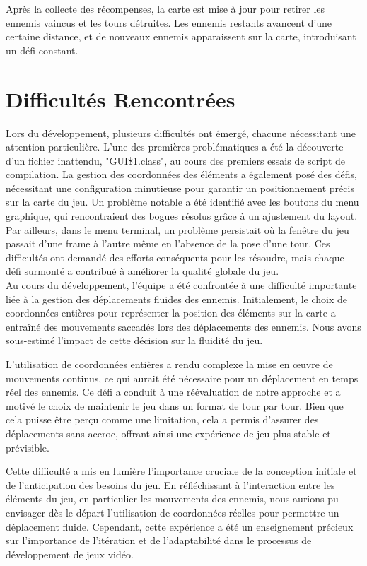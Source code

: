 \documentclass{article}
\begin{document}
Après la collecte des récompenses, la carte est mise à jour pour retirer les ennemis vaincus et les tours détruites. Les ennemis restants avancent d'une certaine distance, et de nouveaux ennemis apparaissent sur la carte, introduisant un défi constant.

\section{Difficultés Rencontrées}
Lors du développement, plusieurs difficultés ont émergé, chacune nécessitant une attention particulière. L'une des premières problématiques a été la découverte d'un fichier inattendu, "GUI\$1.class", au cours des premiers essais de script de compilation. La gestion des coordonnées des éléments a également posé des défis, nécessitant une configuration minutieuse pour garantir un positionnement précis sur la carte du jeu. Un problème notable a été identifié avec les boutons du menu graphique, qui rencontraient des bogues résolus grâce à un ajustement du layout. Par ailleurs, dans le menu terminal, un problème persistait où la fenêtre du jeu passait d'une frame à l'autre même en l'absence de la pose d'une tour. Ces difficultés ont demandé des efforts conséquents pour les résoudre, mais chaque défi surmonté a contribué à améliorer la qualité globale du jeu.\\

Au cours du développement, l'équipe a été confrontée à une difficulté importante liée à la gestion des déplacements fluides des ennemis. Initialement, le choix de coordonnées entières pour représenter la position des éléments sur la carte a entraîné des mouvements saccadés lors des déplacements des ennemis. Nous avons sous-estimé l'impact de cette décision sur la fluidité du jeu.

L'utilisation de coordonnées entières a rendu complexe la mise en œuvre de mouvements continus, ce qui aurait été nécessaire pour un déplacement en temps réel des ennemis. Ce défi a conduit à une réévaluation de notre approche et a motivé le choix de maintenir le jeu dans un format de tour par tour. Bien que cela puisse être perçu comme une limitation, cela a permis d'assurer des déplacements sans accroc, offrant ainsi une expérience de jeu plus stable et prévisible.

Cette difficulté a mis en lumière l'importance cruciale de la conception initiale et de l'anticipation des besoins du jeu. En réfléchissant à l'interaction entre les éléments du jeu, en particulier les mouvements des ennemis, nous aurions pu envisager dès le départ l'utilisation de coordonnées réelles pour permettre un déplacement fluide. Cependant, cette expérience a été un enseignement précieux sur l'importance de l'itération et de l'adaptabilité dans le processus de développement de jeux vidéo.
\end{document}
